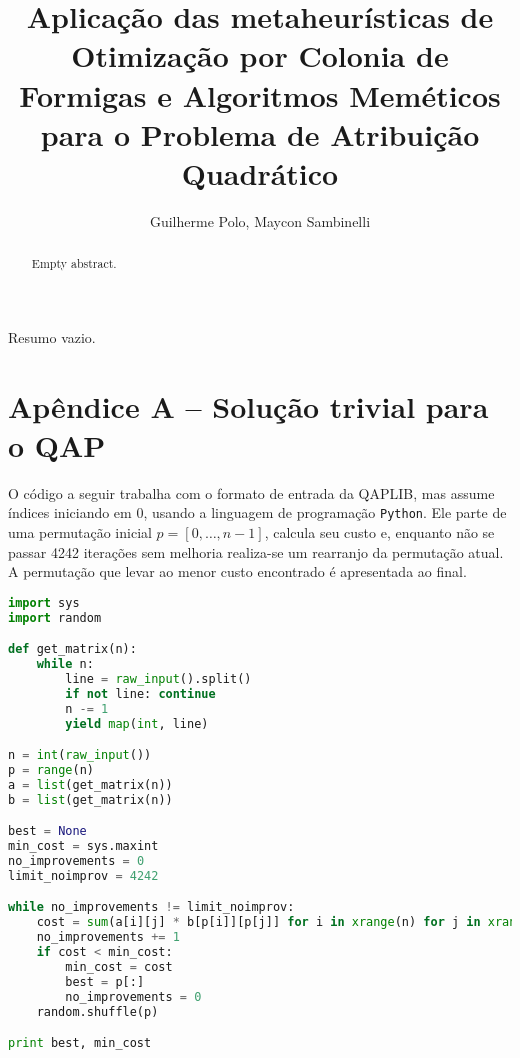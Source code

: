 \documentclass[a4paper, 12pt]{article}
\title{Aplicação das metaheurísticas de Otimização por Colonia
de Formigas e Algoritmos Meméticos para o Problema de Atribuição Quadrático}
\author{Guilherme Polo\inst{1}, Maycon Sambinelli\inst{1}}
\begin{document}
\maketitle

\begin{abstract}
Empty abstract.
\end{abstract}

\begin{resumo}
Resumo vazio.
\end{resumo}






\section*{Apêndice A -- Solução trivial para o QAP}
\label{apendiceA}

O código a seguir trabalha com o formato de entrada da QAPLIB, mas
assume índices iniciando em 0, usando a linguagem de programação
\texttt{Python}. Ele parte de uma permutação inicial $p = [0, \ldots,
n - 1]$, calcula seu custo e, enquanto não se passar 4242 iterações
sem melhoria realiza-se um rearranjo da permutação atual. A permutação
que levar ao menor custo encontrado é apresentada ao final.

\begin{lstlisting}[language=Python,basicstyle=\footnotesize]
import sys
import random

def get_matrix(n):
    while n:
        line = raw_input().split()
        if not line: continue
        n -= 1
        yield map(int, line)

n = int(raw_input())
p = range(n)
a = list(get_matrix(n))
b = list(get_matrix(n))

best = None
min_cost = sys.maxint
no_improvements = 0
limit_noimprov = 4242

while no_improvements != limit_noimprov:
    cost = sum(a[i][j] * b[p[i]][p[j]] for i in xrange(n) for j in xrange(n))
    no_improvements += 1
    if cost < min_cost:
        min_cost = cost
        best = p[:]
        no_improvements = 0
    random.shuffle(p)

print best, min_cost
\end{lstlisting}
\end{document}
